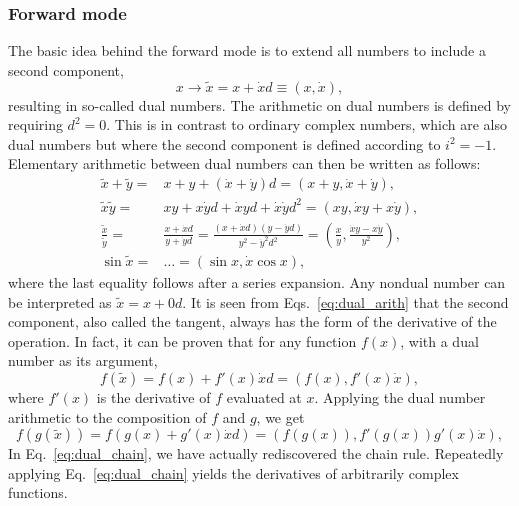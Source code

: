 \documentclass{article}
\begin{document}
\subsubsection{Forward mode}

The basic idea behind the forward mode is to extend all numbers to include a second component,
\begin{equation}
  \label{eq:ddouble}
  x \rightarrow \tilde x = x + \dot x d \equiv (x,\dot x),
\end{equation}
resulting in so-called dual numbers. The arithmetic on dual numbers is defined by requiring $d^2=0$. This is in contrast to ordinary complex numbers, which are also dual numbers but where the second component is defined according to $i^2=-1$. Elementary arithmetic between dual numbers can then be written as follows:
\begin{equation}
  \label{eq:dual_arith}
  \begin{split}
    \tilde x + \tilde y =& x + y + (\dot x + \dot y)d = (x+y, \dot x +
    \dot y), \\
    \tilde x\tilde y =& xy + x\dot yd + \dot xyd + \dot x\dot yd^2 =
    (xy, \dot xy + x\dot y), \\
    \frac{\tilde x}{\tilde y} =& \frac{x + \dot xd}{y + \dot yd} =
    \frac{(x + \dot xd)(y - \dot yd)}{y^2 - \dot y^2 d^2} =
    \left(\frac{x}{y}, \frac{\dot xy - x\dot y}{y^2} \right), \\
    \sin\tilde x =& \ldots = (\sin x, \dot x\cos x),
  \end{split}
\end{equation}
where the last equality follows after a series expansion. Any nondual number can be interpreted as $\tilde x=x+0d$. It is seen from Eqs.~\eqref{eq:dual_arith} that the second component, also called the tangent, always has the form of the derivative of the operation. In fact, it can be proven that for any function $f(x)$, with a dual number as its argument,
\begin{equation}
  \label{eq:dual_general}
  f(\tilde x) = f(x) + f'(x)\dot xd = \left( f(x), f'(x)\dot x
  \right),
\end{equation}
where $f'(x)$ is the derivative of $f$ evaluated at $x$. Applying the dual number arithmetic to the composition of $f$ and $g$, we get
\begin{equation}
  \label{eq:dual_chain}
  f(g(\tilde x)) = f(g(x) + g'(x)\dot xd) = \left( f(g(x)),
    f'(g(x))g'(x)\dot x \right),
\end{equation}
In Eq.~\eqref{eq:dual_chain}, we have actually rediscovered the chain rule. Repeatedly applying Eq.~\eqref{eq:dual_chain} yields the derivatives of arbitrarily complex functions.
\end{document}
